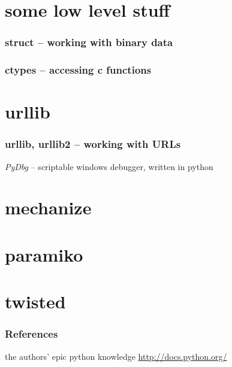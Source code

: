 \documentclass{beamer}
\begin{document}
\section{some low level stuff}

\begin{frame}
	\frametitle{struct -- working with binary data}
	
\end{frame}

\begin{frame}
	\frametitle{ctypes -- accessing c functions}
	
\end{frame}



\section{urllib}

\begin{frame}[fragile]
	\frametitle{urllib, urllib2 -- working with URLs}
	
	\emph{PyDbg} -- scriptable windows debugger, written in python
\end{frame}




\section{mechanize}




\section{paramiko}




\section{twisted}





\begin{frame}
	\frametitle{References}
	\begin{thebibliography}{3}
	 the authors' epic python knowledge
	 \url{http://docs.python.org/}
	\end{thebibliography}
\end{frame}
\end{document}

